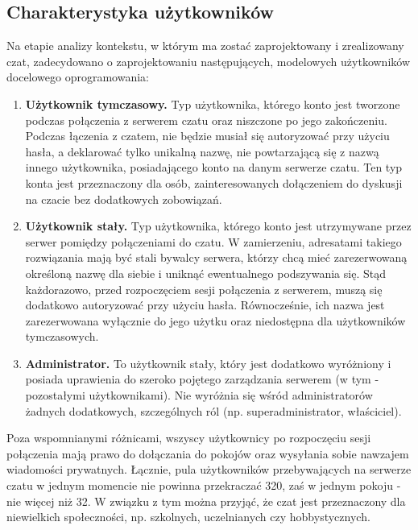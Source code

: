 \documentclass[11pt,oneside,a4paper,titlepage,onecolumn]{article}
\begin{document}
\subsection{Charakterystyka użytkowników}

Na etapie analizy kontekstu, w którym ma zostać zaprojektowany i zrealizowany czat, zadecydowano o zaprojektowaniu następujących,
modelowych użytkowników docelowego oprogramowania:

\begin{enumerate}

	\item \textbf{Użytkownik tymczasowy.} Typ użytkownika, którego konto jest tworzone podczas połączenia z serwerem czatu oraz 
		niszczone po jego zakończeniu. Podczas łączenia z czatem, nie będzie musiał się autoryzować przy użyciu hasła, a deklarować
		tylko unikalną nazwę, nie powtarzającą się z nazwą innego użytkownika, posiadającego konto na danym serwerze czatu. Ten typ
		konta jest przeznaczony dla osób, zainteresowanych dołączeniem do dyskusji na czacie bez dodatkowych zobowiązań.
		
	\item \textbf{Użytkownik stały.} Typ użytkownika, którego konto jest utrzymywane przez serwer pomiędzy połączeniami do czatu. W
		zamierzeniu, adresatami takiego rozwiązania mają być stali bywalcy serwera, którzy chcą mieć zarezerwowaną określoną nazwę
		dla siebie i uniknąć ewentualnego podszywania się. Stąd każdorazowo, przed rozpoczęciem sesji połączenia z serwerem, muszą się
		dodatkowo autoryzować przy użyciu hasła. Równocześnie, ich nazwa jest zarezerwowana wyłącznie do jego użytku oraz niedostępna
		dla użytkowników tymczasowych.
		
	\item \textbf{Administrator.} To użytkownik stały, który jest dodatkowo wyróżniony i posiada uprawienia do szeroko pojętego 
		zarządzania serwerem (w tym - pozostałymi użytkownikami). Nie wyróżnia się wśród administratorów żadnych dodatkowych, szczególnych
		ról (np. superadministrator, właściciel).
		
\end{enumerate}

Poza wspomnianymi różnicami, wszyscy użytkownicy po rozpoczęciu sesji połączenia mają prawo do dołączania do pokojów oraz wysyłania sobie
nawzajem wiadomości prywatnych. Łącznie, pula użytkowników przebywających na serwerze czatu w jednym momencie nie powinna przekraczać 320,
zaś w jednym pokoju - nie więcej niż 32. W związku z tym można przyjąć, że czat jest przeznaczony dla niewielkich społeczności, np.
szkolnych, uczelnianych czy hobbystycznych.
\end{document}
